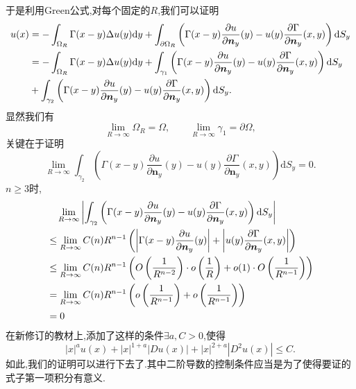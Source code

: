 \documentclass[12pt, a4paper]{ctexbook}
\newcommand{\dy}{\text{d}y}
\newcommand{\dS}{\text{d}S}
\begin{document}
    于是利用Green公式,对每个固定的$R$,我们可以证明
    \begin{align}
    u(x)&= -\int_{\Omega_R} \Gamma(x-y) \Delta u(y) \dy + \int_{\partial \Omega_R} \left(\Gamma(x-y) \frac{\partial u}{\partial \bm{n}_y}(y) -u(y)\frac{\partial \Gamma}{\partial \bm{n}_y}(x,y)   \right) \dS_y \notag \\
    &=-\int_{\Omega_R} \Gamma(x-y) \Delta u(y) \dy + \int_{\gamma_1} \left(\Gamma(x-y) \frac{\partial u}{\partial \bm{n}_y}(y) -u(y)\frac{\partial \Gamma}{\partial \bm{n}_y}(x,y)   \right) \dS_y \notag \\
    &+\int_{\gamma_2} \left(\Gamma(x-y) \frac{\partial u}{\partial \bm{n}_y}(y) -u(y)\frac{\partial \Gamma}{\partial \bm{n}_y}(x,y)   \right) \dS_y. \notag
    \end{align}
    显然我们有$$
    \lim_{R \to \infty}    \Omega_R = \Omega ,\qquad \lim_{R \to \infty} \gamma_1 = \partial \Omega, $$
    关键在于证明$$
    \lim_{R \to \infty}\int_{\gamma_2} \left(\Gamma(x-y) \frac{\partial u}{\partial \bm{n}_y}(y) -u(y)\frac{\partial \Gamma}{\partial \bm{n}_y}(x,y)   \right) \dS_y =0. $$
    $n \ge 3$时,
    \begin{align}
    &\quad \lim_{R \to \infty} \left|\int_{\gamma_2} \left(\Gamma(x-y) \frac{\partial u}{\partial \bm{n}_y}(y) -u(y)\frac{\partial \Gamma}{\partial \bm{n}_y}(x,y)   \right) \dS_y \right| \notag \\
    &\le \lim_{R \to \infty} C(n) R^{n-1} \left( \left| \Gamma(x-y) \frac{\partial u}{\partial \bm{n}_y}(y) \right|+\left|u(y)\frac{\partial \Gamma}{\partial \bm{n}_y}(x,y)   \right| \right) \notag \\
    &\le \lim_{R \to \infty} C(n) R^{n-1} \left( O\left(\frac{1}{R^{n-2}}\right) \cdot o\left(\frac{1}{R}\right) +o(1) \cdot O\left(\frac{1}{R^{n-1}}\right)   \right) \notag \\
    &= \lim_{R \to \infty} C(n) R^{n-1} \left(  o\left(\frac{1}{R^{n-1}}\right) + o\left(\frac{1}{R^{n-1}}\right) \right) \notag \\
    &= 0 \notag
    \end{align}
    {}
    在新修订的教材上,添加了这样的条件$\exists a,C >0$,使得$$
    |x|^a u(x)+|x|^{1+a} |Du(x)| + |x|^{2+a} |D^2 u(x)| \le C. $$
    如此,我们的证明可以进行下去了.其中二阶导数的控制条件应当是为了使得要证的式子第一项积分有意义.
    
\end{document}

